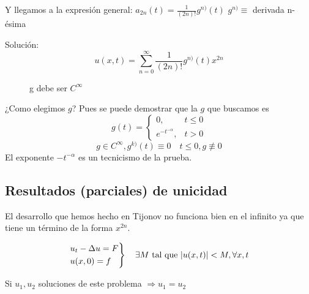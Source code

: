 			Y llegamos a la expresión general: $a_{2n} (t) = \frac{1}{(2n)!} g^{n)} (t)$
			\obs $g^{n)} \equiv$ derivada n-ésima

			Solución:
				\[ u(x,t) = \sum_{n=0}^\infty  \frac{1}{(2n)!} g^{n)} (t) x^{2n}\]

			\begin{figure}[hbtp]
				\begin{minipage}[t]{0.5\textwidth}
				\end{minipage}
				\begin{minipage}[t]{0.5\textwidth}
				\end{minipage}
				\caption{g debe ser $C^\infty$}
			\end{figure}

			¿Como elegimos $g$? Pues se puede demostrar que la $g$ que buscamos es
			\[ g(t) = \begin{cases}
				0,& t \leq 0 \\
				e^{-t^{-\alpha}},&  t>0
			\end{cases}\]
			\[ g \in C^\infty, g^{k)}(t) \equiv 0 \quad t \leq 0, g \not\equiv 0\]
			\obs El exponente $-t^{-\alpha}$ es un tecnicismo de la prueba.

		\subsection{Resultados (parciales) de unicidad}

			El desarrollo que hemos hecho en Tijonov no funciona bien en el infinito ya que tiene un término de la forma $x^{2n}$.

			\begin{theorem}
				\[ \begin{rcases}
					u_t - \Delta u = F \\
					u(x,0) = f
				\end{rcases} \quad \exists M \text{ tal que } |u(x,t)| < M, \forall x, t \]

				Si $u_1, u_2$ soluciones de este problema $\Rightarrow u_1 = u_2$
			\end{theorem}

